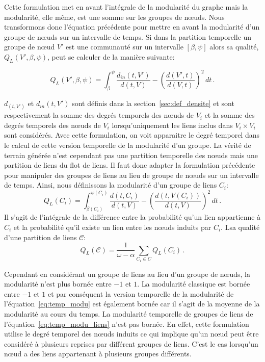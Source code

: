 Cette formulation met en avant l'intégrale de la modularité du graphe mais la modularité, elle même, est une somme sur les groupes de n\oe uds.
Nous transformons donc l'équation précédente pour mettre en avant la modularité d'un groupe de n\oe uds sur un intervalle de temps.
Si dans la partition temporelle un groupe de n\oe ud $V'$ est une communauté sur un intervalle $[\beta, \psi]$ alors sa qualité,$Q_L(V', \beta, \psi)$, peut se calculer de la manière suivante:

\begin{equation}
Q_L(V', \beta, \psi)  = \int_{\beta}^{\psi} \! \dfrac{d_{in}(t,V')}{d(t,V)} - \left( \dfrac{d(V',t)}{d(V,t)} \right)^2  \, dt\, .
\end{equation}

$d_(t,V')$ et $d_{in}(t,V')$ sont définis dans la section~\ref{sec:def_densite} et sont respectivement la somme des degrés temporels des n\oe uds de $V_i$ et la somme des degrés temporels des n\oe uds de $V_i$ lorsqu'uniquement les liens inclus dans $V_i \times V_i$ sont considérés.
Avec cette formulation, on voit apparaitre le degré temporel dans le calcul de cette version temporelle de la modularité d'un groupe.
La vérité de terrain générée n'est cependant pas une partition temporelle des n\oe uds mais une partition de liens du flot de liens.
Il faut donc adapter la formulation précédente pour manipuler des groupes de liens au lieu de groupe de n\oe uds sur un intervalle de temps.
Ainsi, nous définissons la modularité d'un groupe de liens $C_i$:
\begin{equation}
Q_L(C_i)  = \int_{\beta(C_i)}^{\psi(C_i)} \! \dfrac{d(t,C_i)}{d(t,V)} -  \left( \dfrac{d(t,V(C_i))}{d(t,V)} \right)^2 \, dt \,.
\label{}
\end{equation}
Il s'agit de l'intégrale de la différence entre la probabilité qu'un lien appartienne à $C_i$ et la probabilité qu'il existe un lien entre les n\oe uds induits par $C_i$.
Lsa qualité d'une partition de liens $\mathcal{C}$:
\begin{equation}
Q_L(\mathcal{C}) = \dfrac{1}{\omega-\alpha} \sum_{C_i \in C} Q_L(C_i)\, .
\label{eq:temp_modu_liens}
\end{equation}

Cependant en considérant un groupe de liens au lieu d'un groupe de n\oe uds, la modularité n'est plus bornée entre $-1$ et $1$.
La modularité classique est bornée entre $-1$ et $1$ et par conséquent la version temporelle de la modularité de l'équation~\ref{eq:temp_modu} est également bornée car il s'agit de la moyenne de la modularité au cours du temps.
La modularité temporelle de groupes de liens de l'équation~\ref{eq:temp_modu_liens} n'est pas bornée.
En effet, cette formulation utilise le degré temporel des n\oe uds induits ce qui implique qu'un n\oe ud peut être considéré à plusieurs reprises par différent groupes de liens.
C'est le cas lorsqu'un n\oe ud a des liens appartenant à plusieurs groupes différents.

